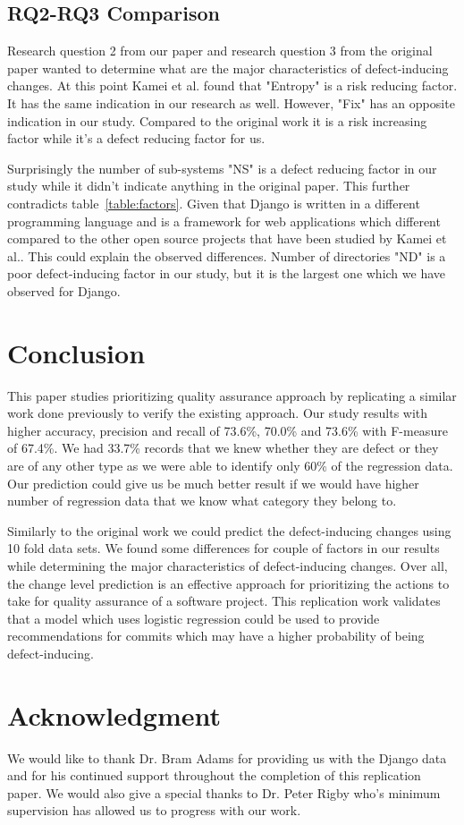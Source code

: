 \documentclass[10pt, conference]{IEEEtran}
\begin{document}
\subsection{RQ2-RQ3 Comparison}
\label{sec:comp-rq23}

Research question 2 from our paper and research question 3 from the original paper wanted to determine what are the major characteristics of defect-inducing changes. At this point Kamei et al. found that "Entropy" is a risk reducing factor. It has the same indication in our research as well. However, "Fix" has an opposite indication in our study. Compared to the original work it is a risk increasing factor while it's a defect reducing factor for us.

Surprisingly the number of sub-systems "NS" is a defect reducing factor in our study while it didn't indicate anything in the original paper. This further contradicts table~\ref{table:factors}. Given that Django is written in a different programming language and is a framework for web applications which different compared to the other open source projects that have been studied by Kamei et al.. This could explain the observed differences. Number of directories "ND" is a poor defect-inducing factor in our study, but it is the largest one which we have observed for Django.

\section{Conclusion}
\label{sec:conclusion}

This paper studies prioritizing quality assurance approach by replicating a similar work done previously to verify the existing approach. Our study results with higher accuracy, precision and recall of 73.6\%, 70.0\% and 73.6\% with F-measure of 67.4\%. We had 33.7\% records that we knew whether they are defect or they are of any other type as we were able to identify only 60\% of the regression data. Our prediction could give us be much better result if we would have higher number of regression data that we know what category they belong to.

Similarly to the original work we could predict the defect-inducing changes using 10 fold data sets. We found some differences for couple of factors in our results while determining the major characteristics of defect-inducing changes. Over all, the change level prediction is an effective approach for prioritizing the actions to take for quality assurance of a software project. This replication work validates that a model which uses logistic regression could be used to provide recommendations for commits which may have a higher probability of being defect-inducing.

\section*{Acknowledgment}
We would like to thank Dr. Bram Adams for providing us with the Django data and for his continued support throughout the completion of this replication paper. We would also give a special thanks to Dr. Peter Rigby who's minimum supervision has allowed us to progress with our work.

\balance


\end{document}
